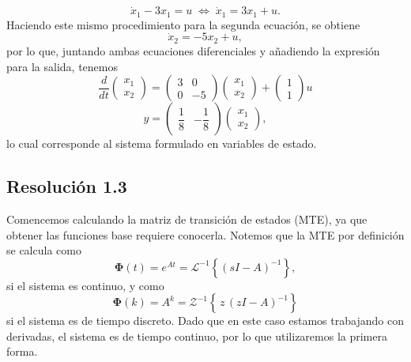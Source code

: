 \documentclass[
  11pt,
  letterpaper,
   addpoints,
   answers
  ]{exam}
\begin{document}
\begin{questions}
\begin{solution}
\begin{equation}
\dot{x}_1 - 3x_1 = u \;\Leftrightarrow\; \dot{x}_1 = 3x_1 + u.
\end{equation}
Haciendo este mismo procedimiento para la segunda ecuación, se obtiene
\begin{equation}
\dot{x}_2 = -5x_2 + u,
\end{equation}
por lo que, juntando ambas ecuaciones diferenciales y añadiendo la expresión para la salida, tenemos
\begin{equation}
\frac{d}{dt}\begin{pmatrix} x_1 \\ x_2 \end{pmatrix}
=
\begin{pmatrix} 3 & 0 \\[2pt] 0 & -5 \end{pmatrix}
\begin{pmatrix} x_1 \\ x_2 \end{pmatrix}
+
\begin{pmatrix} 1 \\ 1 \end{pmatrix} u
\end{equation}
\begin{equation}
y = \begin{pmatrix} \dfrac{1}{8} & -\dfrac{1}{8} \end{pmatrix}
\begin{pmatrix} x_1 \\ x_2 \end{pmatrix},
\end{equation}
lo cual corresponde al sistema formulado en variables de estado.
\subsection*{Resolución 1.3}
Comencemos calculando la matriz de transición de estados (MTE), ya que obtener las funciones base requiere conocerla.
Notemos que la MTE por definición se calcula como
\setcounter{equation}{26}
\begin{equation}
\boldsymbol{\Phi}(t)=e^{At}=\mathcal{L}^{-1}\!\left\{(sI-A)^{-1}\right\},
\end{equation}
si el sistema es continuo, y como
\begin{equation}
\boldsymbol{\Phi}(k)=A^k=\mathcal{Z}^{-1}\!\left\{\,z\,(zI-A)^{-1}\right\}
\end{equation}
si el sistema es de tiempo discreto. Dado que en este caso estamos trabajando con derivadas, el
sistema es de tiempo continuo, por lo que utilizaremos la primera forma.


\end{solution}
\end{questions}
\end{document}
